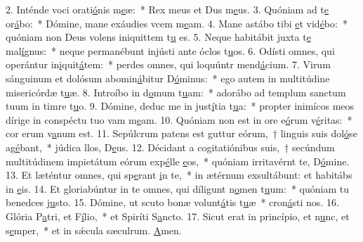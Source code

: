 2. Inténde voci orati\uline{ó}nis m\uline{e}æ:~* Rex meus et Dus m\uline{e}us.
3. Quóniam ad t\uline{e} or\uline{á}bo:~* Dómine, mane exáudies vcem m\uline{e}am.
4. Mane astábo tibi \uline{e}t vid\uline{é}bo:~* quóniam non Deus volens iniquittem t\uline{u} es.
5. Neque habitábit juxta t\uline{e} mal\uline{í}gnus:~* neque permanébunt injústi ante óclos t\uline{u}os.
6. Odísti omnes, qui operántur in\uline{i}quit\uline{á}tem:~* perdes omnes, qui loquúntr mend\uline{á}cium.
7. Virum sánguinum et dolósum abomin\uline{á}bitur D\uline{ó}minus:~* ego autem in multitúdine misericórdæ t\uline{u}æ.
8. Introíbo in d\uline{o}mum t\uline{u}am:~* adorábo ad templum sanctum tuum in timre t\uline{u}o.
9. Dómine, deduc me in just\uline{í}tia t\uline{u}a:~* propter inimícos meos dírige in conspéctu tuo vam m\uline{e}am.
10. Quóniam non est in ore e\uline{ó}rum v\uline{é}ritas:~* cor erum v\uline{a}num est.
11. Sepúlcrum patens est guttur eórum,~† linguis suis dol\uline{ó}se ag\uline{é}bant,~* júdica llos, D\uline{e}us.
12. Décidant a cogitatiónibus suis,~† secúndum multitúdinem impietátum eórum exp\uline{é}lle \uline{e}os,~* quóniam irritavérnt te, D\uline{ó}mine.
13. Et læténtur omnes, qui sp\uline{e}rant \uline{i}n te,~* in ætérnum exsultábunt: et habitábs in \uline{e}is.
14. Et gloriabúntur in te omnes, qui díligunt n\uline{o}men t\uline{u}um:~* quóniam tu benedces j\uline{u}sto.
15. Dómine, ut scuto bonæ volunt\uline{á}tis t\uline{u}æ~* cron\uline{á}sti nos.
16. Glória P\uline{a}tri, et F\uline{í}lio,~* et Spiríti S\uline{a}ncto.
17. Sicut erat in princípio, et n\uline{u}nc, et s\uline{e}mper,~* et in sǽcula sæculrum. \uline{A}men.
